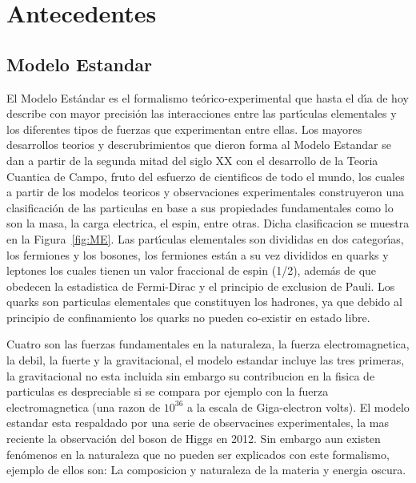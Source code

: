 \chapter{Antecedentes}

\section{Modelo Estandar}

El Modelo Est\'andar es el formalismo te\'orico-experimental que hasta el d\'{\i}a de hoy  describe con mayor precisi\'on las interacciones entre las part\'{\i}culas elementales y los diferentes tipos de fuerzas que experimentan entre ellas. Los mayores desarrollos teorios y descrubrimientos que dieron forma al Modelo Estandar se dan a partir de la segunda mitad del siglo XX con el desarrollo de la Teoria Cuantica de Campo, fruto del esfuerzo de cientificos de todo el mundo, los cuales a partir de los modelos teoricos y observaciones experimentales construyeron una clasificaci\'on de las particulas en base a sus propiedades fundamentales como lo son la masa, la carga electrica, el espin, entre otras. Dicha clasificacion se muestra en la Figura~\ref{fig:ME}. Las part\'{\i}culas elementales son divididas en dos categor\'{\i}as, los fermiones y los bosones, los fermiones est\'an a su vez divididos en quarks y leptones los cuales tienen un valor fraccional de espin (1/2), adem\'as de que obedecen la estadistica de Fermi-Dirac y el principio de exclusion de Pauli. Los quarks son particulas elementales que constituyen los hadrones, ya que debido al principio de confinamiento los quarks no pueden co-existir en estado libre.

Cuatro son las fuerzas fundamentales en la naturaleza, la fuerza electromagnetica, la debil, la fuerte y la gravitacional, el modelo estandar incluye las tres primeras, la gravitacional no esta incluida sin embargo su contribucion en la fisica de particulas es despreciable si se compara por ejemplo con la fuerza electromagnetica (una razon de $10^{36}$ a la escala de Giga-electron volts). El modelo estandar esta respaldado por una serie de observacines experimentales, la mas reciente la observaci\'on del boson de Higgs en 2012. Sin embargo aun existen fen\'omenos en la naturaleza que no pueden ser explicados con este formalismo, ejemplo de ellos son: La composicion y naturaleza de la materia y energia oscura.


